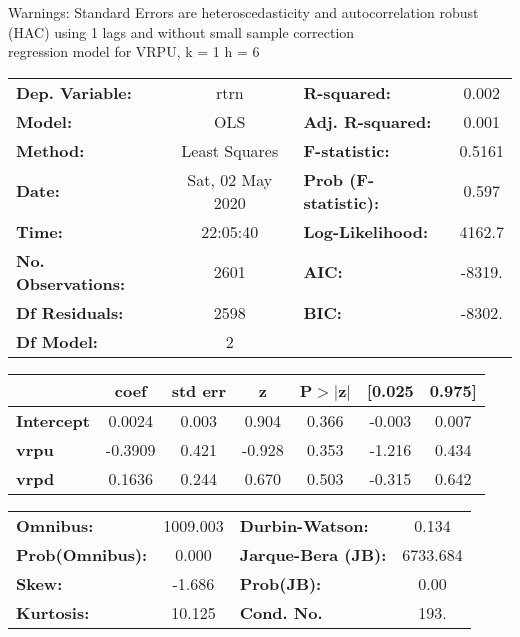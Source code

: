 Warnings: \newline
 [1] Standard Errors are heteroscedasticity and autocorrelation robust (HAC) using 1 lags and without small sample correction\\ 

regression model for VRPU, k = 1 h = 6\begin{center}
\begin{tabular}{lclc}
\toprule
\textbf{Dep. Variable:}    &       rtrn       & \textbf{  R-squared:         } &     0.002   \\
\textbf{Model:}            &       OLS        & \textbf{  Adj. R-squared:    } &     0.001   \\
\textbf{Method:}           &  Least Squares   & \textbf{  F-statistic:       } &    0.5161   \\
\textbf{Date:}             & Sat, 02 May 2020 & \textbf{  Prob (F-statistic):} &    0.597    \\
\textbf{Time:}             &     22:05:40     & \textbf{  Log-Likelihood:    } &    4162.7   \\
\textbf{No. Observations:} &        2601      & \textbf{  AIC:               } &    -8319.   \\
\textbf{Df Residuals:}     &        2598      & \textbf{  BIC:               } &    -8302.   \\
\textbf{Df Model:}         &           2      & \textbf{                     } &             \\
\bottomrule
\end{tabular}
\begin{tabular}{lcccccc}
                   & \textbf{coef} & \textbf{std err} & \textbf{z} & \textbf{P$> |$z$|$} & \textbf{[0.025} & \textbf{0.975]}  \\
\midrule
\textbf{Intercept} &       0.0024  &        0.003     &     0.904  &         0.366        &       -0.003    &        0.007     \\
\textbf{vrpu}      &      -0.3909  &        0.421     &    -0.928  &         0.353        &       -1.216    &        0.434     \\
\textbf{vrpd}      &       0.1636  &        0.244     &     0.670  &         0.503        &       -0.315    &        0.642     \\
\bottomrule
\end{tabular}
\begin{tabular}{lclc}
\textbf{Omnibus:}       & 1009.003 & \textbf{  Durbin-Watson:     } &    0.134  \\
\textbf{Prob(Omnibus):} &   0.000  & \textbf{  Jarque-Bera (JB):  } & 6733.684  \\
\textbf{Skew:}          &  -1.686  & \textbf{  Prob(JB):          } &     0.00  \\
\textbf{Kurtosis:}      &  10.125  & \textbf{  Cond. No.          } &     193.  \\
\bottomrule
\end{tabular}
\end{center}

